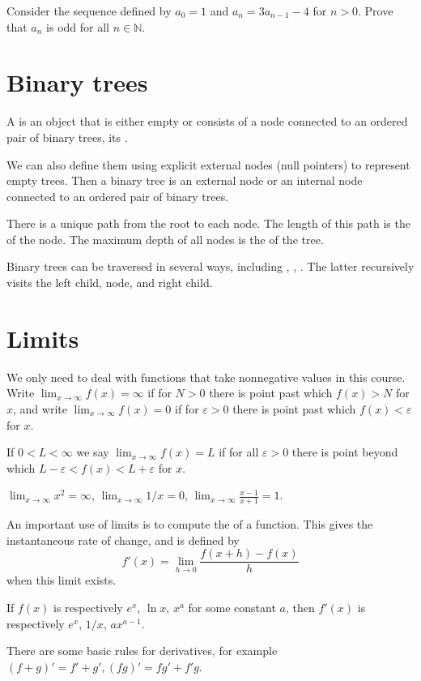 \begin{Boxample}[4]
Consider the sequence defined by $a_0 = 1$ and $a_n = 3a_{n-1} - 4$ for $n > 0$. Prove that $a_n$ is odd for all $n \in \mathbb{N}$.
\end{Boxample}


\section{Binary trees}
A  is an object that is either empty or consists of a  node connected to an ordered pair of binary trees, its .
 
We can also define them using explicit external nodes (null pointers) to represent empty trees. Then a binary tree is an external node or an internal node connected to an ordered pair of binary trees.

There is a unique path from the root to each node. The length of this path is the  of the node. The maximum depth of all nodes is the  of the tree.

Binary trees can be traversed in several ways, including , , . 
The latter recursively visits the left child, node, and right child.


\section{Limits}
We only need to deal with functions that take nonnegative values in this course.
Write $\lim_{x \to \infty} f(x) = \infty$ if for  $N>0$ there is  point past which $f(x) > N$ for  $x$, 
and write $\lim_{x\to\infty} f(x) = 0$ if for  $\varepsilon>0$ there is  point past which $f(x) < \varepsilon$ for  $x$.

If $0 < L < \infty$ we say $\lim_{x \to \infty} f(x) = L$ if for all $\varepsilon > 0$ there is  point 
beyond which $L - \varepsilon < f(x) < L + \varepsilon$ for  $x$.

\begin{Boxample}
$\lim_{x \to \infty} x^2 = \infty$, $\lim_{x \to \infty} 1/x = 0$, $\lim_{x\to \infty} \frac{x-1}{x+1} = 1$.
\end{Boxample}

An important use of limits is to compute the  of a function. This gives the instantaneous rate of change, and is defined by 
$$
f'(x) = \lim_{h\to 0} \frac{f(x+h) - f(x)}{h}
$$
when this limit exists.
\begin{Boxample}[4]
If $f(x)$ is respectively $e^x$, $\ln x$, $x^a$ for some constant $a$, then $f'(x)$ is respectively $e^x$, $1/x$, $ax^{a-1}$.
\end{Boxample}
There are some basic rules for derivatives, for example $(f+g)' = f'+g', (fg)' = fg'+f'g$.

